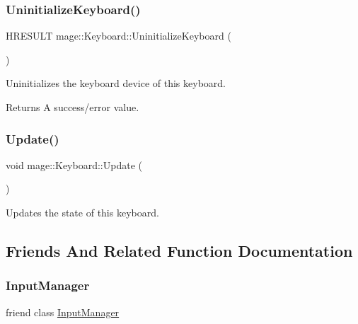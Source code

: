 \subsubsection{\texorpdfstring{Uninitialize\+Keyboard()}{UninitializeKeyboard()}}
{\footnotesize\ttfamily H\+R\+E\+S\+U\+LT mage\+::\+Keyboard\+::\+Uninitialize\+Keyboard (\begin{DoxyParamCaption}{ }\end{DoxyParamCaption})\hspace{0.3cm}{\ttfamily [protected]}}

Uninitializes the keyboard device of this keyboard.

\begin{DoxyReturn}{Returns}
A success/error value. 
\end{DoxyReturn}
\hypertarget{classmage_1_1_keyboard_abb5fd91a304f8bbf8b15ab1a277dafaf}{}\label{classmage_1_1_keyboard_abb5fd91a304f8bbf8b15ab1a277dafaf} 
\subsubsection{\texorpdfstring{Update()}{Update()}}
{\footnotesize\ttfamily void mage\+::\+Keyboard\+::\+Update (\begin{DoxyParamCaption}{ }\end{DoxyParamCaption})\hspace{0.3cm}{\ttfamily [protected]}}

Updates the state of this keyboard. 

\subsection{Friends And Related Function Documentation}
\hypertarget{classmage_1_1_keyboard_af0e8c3dcc20b7ddcaf63506363a22821}{}\label{classmage_1_1_keyboard_af0e8c3dcc20b7ddcaf63506363a22821} 
\subsubsection{\texorpdfstring{Input\+Manager}{InputManager}}
{\footnotesize\ttfamily friend class \hyperlink{classmage_1_1_input_manager}{Input\+Manager}\hspace{0.3cm}{\ttfamily [friend]}}



